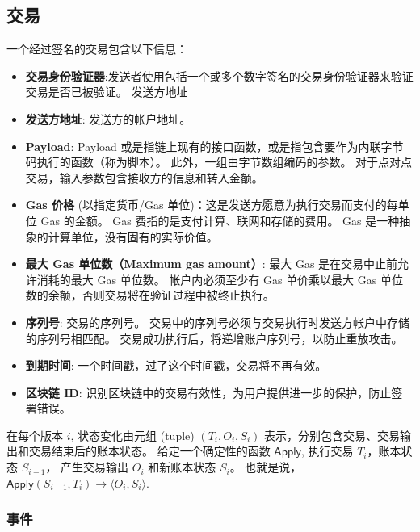 \documentclass{article}
\begin{document}
\subsection{交易}

一个经过签名的交易包含以下信息：

\begin{itemize}
\item \textbf{交易身份验证器}:发送者使用包括一个或多个数字签名的交易身份验证器来验证交易是否已被验证。
发送方地址
\item \textbf{发送方地址}: 发送方的帐户地址。

\item \textbf{Payload}: Payload 或是指链上现有的接口函数，或是指包含要作为内联字节码执行的函数（称为脚本）。 此外，一组由字节数组编码的参数。 对于点对点交易，输入参数包含接收方的信息和转入金额。

\item \textbf{Gas 价格} (以指定货币/Gas 单位)：这是发送方愿意为执行交易而支付的每单位 Gas 的金额。 Gas 费指的是支付计算、联网和存储的费用。 Gas 是一种抽象的计算单位，没有固有的实际价值。

\item \textbf{最大 Gas 单位数（Maximum gas amount）}: 最大 Gas 是在交易中止前允许消耗的最大 Gas 单位数。 帐户内必须至少有 Gas 单价乘以最大 Gas 单位数的余额，否则交易将在验证过程中被终止执行。

\item \textbf{序列号}: 交易的序列号。 交易中的序列号必须与交易执行时发送方帐户中存储的序列号相匹配。 交易成功执行后，将递增账户序列号，以防止重放攻击。

\item \textbf{到期时间}: 一个时间戳，过了这个时间戳，交易将不再有效。

\item \textbf{区块链 ID}: 识别区块链中的交易有效性，为用户提供进一步的保护，防止签署错误。

\end{itemize}
在每个版本 $i$, 状态变化由元组 (tuple) $(T_i, O_i, S_i)$ 表示，分别包含交易、交易输出和交易结束后的账本状态。 给定一个确定性的函数 $\textsf{Apply}$, 执行交易 $T_i$，账本状态 $S_{i-1}$， 产生交易输出 $O_i$ 和新账本状态 $S_i$。 也就是说， $\textsf{Apply}(S_{i-1}, T_i) \rightarrow \langle O_i, S_i\rangle$. 

\subsubsection{事件}
\label{subsub:events}
\end{document}
